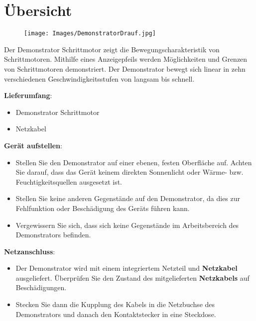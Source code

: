%
%



\chapter{Übersicht}

\begin{figure}[htb]
	\begin{center}
			\texttt{[image: Images/DemonstratorDrauf.jpg]}
	\end{center}
\end{figure}

Der Demonstrator Schrittmotor zeigt die Bewegungscharakteristik von Schrittmotoren. Mithilfe eines Anzeigepfeils werden Möglichkeiten und Grenzen von Schrittmotoren demonstriert. Der Demonstrator bewegt sich linear in zehn verschiedenen Geschwindigkeitsstufen von langsam bis schnell. 

\textbf{Lieferumfang}: 
\begin{itemize}
\item Demonstrator Schrittmotor	
\item Netzkabel
	\end{itemize} 	
	\bigskip
	\textbf{Gerät aufstellen}: 
	\begin{itemize}
	\item Stellen Sie den Demonstrator auf einer ebenen, festen Oberfläche auf. Achten Sie darauf, dass das Gerät keinem direkten Sonnenlicht oder Wärme- bzw. Feuchtigkeitsquellen ausgesetzt ist. 
	\item Stellen Sie keine anderen Gegenstände auf den Demonstrator, da dies zur Fehlfunktion oder Beschädigung des Geräts führen kann. 
	\item Vergewissern Sie sich, dass sich keine Gegenstände im Arbeitsbereich des Demonstrators befinden.
	\end{itemize}
	\textbf{Netzanschluss}:
	\begin{itemize}
		\item Der Demonstrator wird mit einem integriertem Netzteil und \textbf{Netzkabel} ausgeliefert. Überprüfen Sie den Zustand des mitgelieferten \textbf{Netzkabels} auf Beschädigungen.
		\item Stecken Sie dann die Kupplung des Kabels in die Netzbuchse des Demonstrators und danach den Kontaktstecker in eine Steckdose. 
	\end{itemize} 



